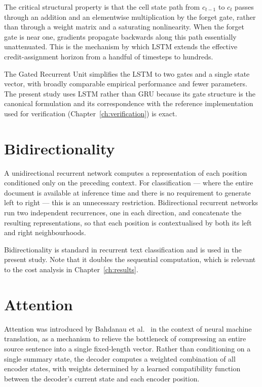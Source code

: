 The critical structural property is that the cell state path from $c_{t-1}$ to $c_t$ passes through
an addition and an elementwise multiplication by the forget gate, rather than through a weight
matrix and a saturating nonlinearity. When the forget gate is near one, gradients propagate
backwards along this path essentially unattenuated. This is the mechanism by which LSTM extends
the effective credit-assignment horizon from a handful of timesteps to hundreds.

The Gated Recurrent Unit \cite{cho2014} simplifies the LSTM to two gates and a single state
vector, with broadly comparable empirical performance and fewer parameters. The present study uses
LSTM rather than GRU because its gate structure is the canonical formulation and its correspondence
with the reference implementation used for verification (Chapter~\ref{ch:verification}) is exact.

\section{Bidirectionality}

A unidirectional recurrent network computes a representation of each position conditioned only on
the preceding context. For classification --- where the entire document is available at inference
time and there is no requirement to generate left to right --- this is an unnecessary restriction.
Bidirectional recurrent networks \cite{schuster1997} run two independent recurrences, one in each
direction, and concatenate the resulting representations, so that each position is contextualised
by both its left and right neighbourhoods.

Bidirectionality is standard in recurrent text classification and is used in the present study.
Note that it doubles the sequential computation, which is relevant to the cost analysis in
Chapter~\ref{ch:results}.

\section{Attention}

Attention was introduced by Bahdanau et al.\ \cite{bahdanau2015} in the context of neural machine
translation, as a mechanism to relieve the bottleneck of compressing an entire source sentence
into a single fixed-length vector. Rather than conditioning on a single summary state, the decoder
computes a weighted combination of all encoder states, with weights determined by a learned
compatibility function between the decoder's current state and each encoder position.

